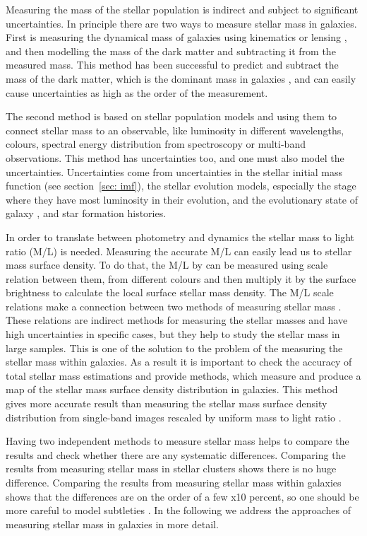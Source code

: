 Measuring the mass of the stellar population is indirect and subject to significant uncertainties. In principle there are two ways to measure stellar mass in galaxies. First is measuring the dynamical mass of galaxies using kinematics \citep{Cappellari06} or lensing \citep{Auger09}, and then modelling the mass of the dark matter and subtracting it from the measured mass. This method has been successful to predict and subtract the mass of the dark matter, which is the dominant mass in galaxies \citep{Zaritsky94},  and can easily cause uncertainties as high as the order of the measurement. 

The second method is based on stellar population models \citep[e.g.][]{ Bruzual93, Kotulla09} and using them to connect stellar mass to an observable, like luminosity in different wavelengths, colours, spectral energy distribution from spectroscopy or multi-band observations. This method has uncertainties too, and one must also model the uncertainties. Uncertainties come from uncertainties in the stellar initial mass function (see section{~\ref{sec: imf}}), the stellar evolution models, especially the stage where they have most luminosity in their evolution, and the evolutionary state of galaxy \citep[see,][]{Dalcanton12}, and star formation histories. 

In order to translate between photometry and dynamics the stellar mass to light ratio (M/L) is needed. Measuring the accurate M/L can easily lead us to stellar mass surface density.  To do that, the M/L by can be measured using scale relation between them, from different colours and then multiply it by the surface brightness to calculate the local surface stellar mass density. The M/L scale relations make a connection between two methods of measuring stellar mass \citep{Bell03}. These relations are indirect methods for measuring the stellar masses and have high uncertainties in specific cases, but they help to study the stellar mass in large samples. This is one of the solution to the problem of the measuring the stellar mass within galaxies. As a result it is important to check the accuracy of total stellar mass estimations and provide methods, which measure and produce a map of the stellar mass surface density distribution in galaxies. This method gives more accurate result than measuring the stellar mass surface density distribution from single-band images rescaled by uniform mass to light ratio \cite{Zibetti09}.
 
Having two independent methods to measure stellar mass helps to compare the results and check whether there are any systematic differences. Comparing the results from measuring stellar mass in stellar clusters shows there is no huge difference. Comparing the results from measuring stellar mass within galaxies shows that the differences are on the order of a few x10 percent, so one should be more careful to model subtleties \citep{McLaughlin05}. In the following we address the approaches of measuring stellar mass in galaxies in more detail.

